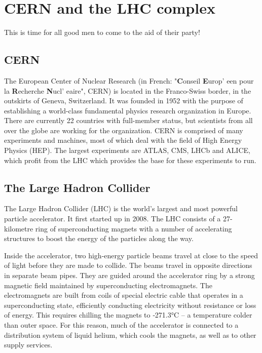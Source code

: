 
\section{CERN and the LHC complex}
This is time for all good men to come to the aid of their party!


\subsection{CERN}
The European Center of Nuclear Research (in French: "\textbf{C}onseil \textbf{E}urop\a' een pour la \textbf{R}echerche \textbf{N}ucl\a' eaire", CERN) \cite{cern} is located in the Franco-Swiss border, in the outskirts of Geneva, Switzerland. It was founded in 1952 with the purpose of establishing a world-class fundamental physics research organization in Europe. There are currently 22 countries with full-member status, but scientists from all over the globe are working for the organization. CERN is comprised of many experiments and machines, most of which deal with the field of High Energy Physics (HEP). The largest experiments are ATLAS, CMS, LHCb and ALICE, which profit from the LHC which provides the base for these experiments to run.

\subsection{The Large Hadron Collider}
The Large Hadron Collider (LHC) is the world’s largest and most powerful particle accelerator. It first started up in 2008. The LHC consists of a 27-kilometre ring of superconducting magnets with a number of accelerating structures to boost the energy of the particles along the way.

Inside the accelerator, two high-energy particle beams travel at close to the speed of light before they are made to collide. The beams travel in opposite directions in separate beam pipes. They are guided around the accelerator ring by a strong magnetic field maintained by superconducting electromagnets. The electromagnets are built from coils of special electric cable that operates in a superconducting state, efficiently conducting electricity without resistance or loss of energy. This requires chilling the magnets to ‑271.3°C – a temperature colder than outer space. For this reason, much of the accelerator is connected to a distribution system of liquid helium, which cools the magnets, as well as to other supply services.

